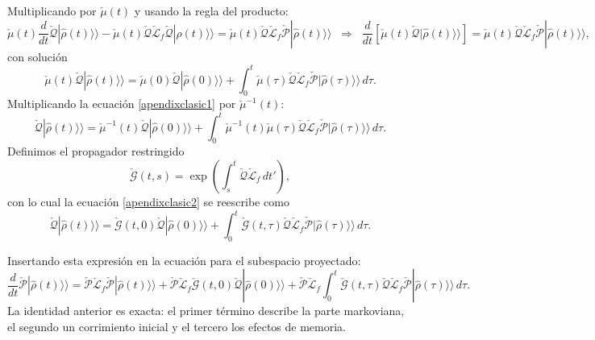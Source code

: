 \begin{appendixs}
Multiplicando por $\check{\mu}(t)$ y usando la regla del producto:
\begin{equation*}
    \check{\mu}(t)\frac{d}{dt}\check{\mathcal{Q}}|\hat{\rho}(t)\rangle\rangle
    -\check{\mu}(t)\check{\mathcal{Q}}\check{\mathcal{L}}_{f}\check{\mathcal{Q}}|\hat{\rho}(t)\rangle\rangle
    =\check{\mu}(t)\check{\mathcal{Q}}\check{\mathcal{L}}_{f}\check{\mathcal{P}}|\hat{\rho}(t)\rangle\rangle
    \;\;\Longrightarrow\;\;
    \frac{d}{dt}\!\left[\check{\mu}(t)\check{\mathcal{Q}}|\hat{\rho}(t)\rangle\rangle\right]
    =\check{\mu}(t)\check{\mathcal{Q}}\check{\mathcal{L}}_{f}\check{\mathcal{P}}|\hat{\rho}(t)\rangle\rangle,
\end{equation*}
con solución
\begin{equation}
    \check{\mu}(t)\check{\mathcal{Q}}|\hat{\rho}(t)\rangle\rangle
    =\check{\mu}(0)\check{\mathcal{Q}}|\hat{\rho}(0)\rangle\rangle
     +\int_{0}^{t}\check{\mu}(\tau)\check{\mathcal{Q}}\check{\mathcal{L}}_{f}\check{\mathcal{P}}
        |\hat{\rho}(\tau)\rangle\rangle\,d\tau .
    \label{apendixclasic1}
\end{equation}
Multiplicando la ecuación \eqref{apendixclasic1} por $\check{\mu}^{-1}(t)$:
\begin{equation}
    \check{\mathcal{Q}}|\hat{\rho}(t)\rangle\rangle
    =\check{\mu}^{-1}(t)\check{\mathcal{Q}}|\hat{\rho}(0)\rangle\rangle
     +\int_{0}^{t}\check{\mu}^{-1}(t)\check{\mu}(\tau)\check{\mathcal{Q}}\check{\mathcal{L}}_{f}\check{\mathcal{P}}
     |\hat{\rho}(\tau)\rangle\rangle\,d\tau .
    \label{apendixclasic2}
\end{equation}
Definimos el propagador restringido
\begin{equation*}
    \check{\mathcal{G}}(t,s)=\exp\!\left(\int_{s}^{t}\check{\mathcal{Q}}\check{\mathcal{L}}_{f}\,dt'\right),
\end{equation*}
con lo cual la ecuación \eqref{apendixclasic2} se reescribe como
\begin{equation*}
    \check{\mathcal{Q}}|\hat{\rho}(t)\rangle\rangle
    =\check{\mathcal{G}}(t,0)\check{\mathcal{Q}}|\hat{\rho}(0)\rangle\rangle
     +\int_{0}^{t}\check{\mathcal{G}}(t,\tau)\check{\mathcal{Q}}\check{\mathcal{L}}_{f}\check{\mathcal{P}}
        |\hat{\rho}(\tau)\rangle\rangle\,d\tau .
\end{equation*}

Insertando esta expresión en la ecuación para el subespacio proyectado:
\begin{equation}
    \frac{d}{dt}\check{\mathcal{P}}|\hat{\rho}(t)\rangle\rangle
    =\check{\mathcal{P}}\check{\mathcal{L}}_{f}\check{\mathcal{P}}|\hat{\rho}(t)\rangle\rangle
     +\check{\mathcal{P}}\check{\mathcal{L}}_{f}\check{\mathcal{G}}(t,0)\check{\mathcal{Q}}|\hat{\rho}(0)\rangle\rangle
     +\check{\mathcal{P}}\check{\mathcal{L}}_{f}\!\int_{0}^{t}\!\check{\mathcal{G}}(t,\tau)\check{\mathcal{Q}}\check{\mathcal{L}}_{f}\check{\mathcal{P}}
       |\hat{\rho}(\tau)\rangle\rangle\,d\tau .
    \label{apendix5exactp}
\end{equation}
La identidad anterior es exacta: el primer término describe la parte markoviana, el segundo un
corrimiento inicial y el tercero los efectos de memoria.


\end{appendixs}
